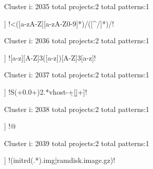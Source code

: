 Cluster i: 2035
total projects:2
total patterns:1
\begin{multicols}{1}
\begin{description}[noitemsep,topsep=0pt]
\item [[2] ] \cverb!<([a-zA-Z][a-zA-Z0-9]*)/([^/]*)/!
\end{description}
\end{multicols}







Cluster i: 2036
total projects:2
total patterns:1
\begin{multicols}{1}
\begin{description}[noitemsep,topsep=0pt]
\item [[2] ] \cverb![a-z][A-Z]{3}([a-z])[A-Z]{3}[a-z]!
\end{description}
\end{multicols}







Cluster i: 2037
total projects:2
total patterns:1
\begin{multicols}{1}
\begin{description}[noitemsep,topsep=0pt]
\item [[2] ] \cverb!S(\s+0.0+){2}.*vhost-\d+[\d|+]!
\end{description}
\end{multicols}







Cluster i: 2038
total projects:2
total patterns:1
\begin{multicols}{1}
\begin{description}[noitemsep,topsep=0pt]
\item [[2] ] \cverb!@%
\end{description}
\end{multicols}







Cluster i: 2039
total projects:2
total patterns:1
\begin{multicols}{1}
\begin{description}[noitemsep,topsep=0pt]
\item [[2] ] \cverb!(initrd(.*).img|ramdisk.image.gz)!
\end{description}
\end{multicols}







